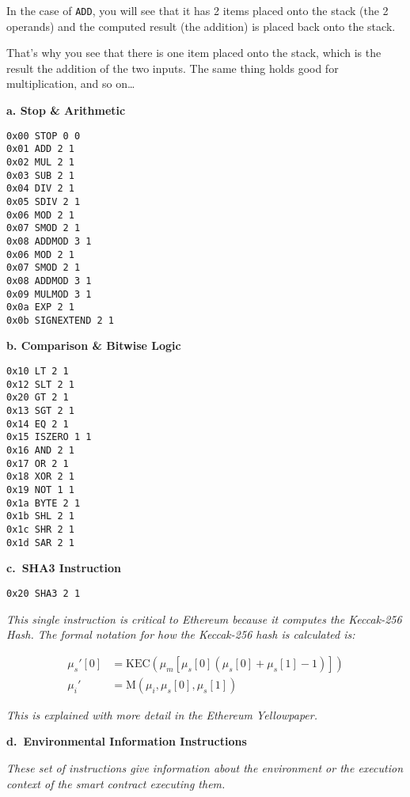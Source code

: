 In the case of \texttt{ADD}, you will see that it has 2 items placed
onto the stack (the 2 operands) and the computed result (the addition)
is placed back onto the stack.

That's why you see that there is one item placed onto the stack, which
is the result the addition of the two inputs. The same thing holds good
for multiplication, and so on\ldots{}

\hfill\break
\textbf{a. Stop \& Arithmetic}

\begin{lstlisting}[language=Solidity,numbers=none]
0x00 STOP 0 0
0x01 ADD 2 1
0x02 MUL 2 1
0x03 SUB 2 1
0x04 DIV 2 1
0x05 SDIV 2 1
0x06 MOD 2 1
0x07 SMOD 2 1
0x08 ADDMOD 3 1
0x06 MOD 2 1
0x07 SMOD 2 1
0x08 ADDMOD 3 1
0x09 MULMOD 3 1
0x0a EXP 2 1
0x0b SIGNEXTEND 2 1
\end{lstlisting}

\hfill\break
\textbf{b. Comparison \& Bitwise Logic}

\begin{lstlisting}[language=Solidity,numbers=none]
0x10 LT 2 1
0x12 SLT 2 1
0x20 GT 2 1
0x13 SGT 2 1
0x14 EQ 2 1
0x15 ISZERO 1 1
0x16 AND 2 1
0x17 OR 2 1
0x18 XOR 2 1
0x19 NOT 1 1
0x1a BYTE 2 1   
0x1b SHL 2 1
0x1c SHR 2 1
0x1d SAR 2 1
\end{lstlisting}

\hfill\break
\textbf{c.~SHA3 Instruction}

\begin{lstlisting}[language=Solidity,numbers=none]
0x20 SHA3 2 1
\end{lstlisting}

\emph{This single instruction is critical to Ethereum because it
computes the Keccak-256 Hash. The formal notation for how the Keccak-256
hash is calculated is:}

\begin{align*}
\mu_s'[0]&=\text{KEC}\left(\mu_m\left[\mu_s[0]\left(\mu_s[0]+\mu_s[1]-1\right)\right]\right)\\
\mu_i'&=\text{M}\left(\mu_i,\mu_s[0],\mu_s[1]\right)
\end{align*}

\emph{This is explained with more detail in the Ethereum Yellowpaper.}

\hfill\break
\textbf{d.~Environmental Information Instructions}

\emph{These set of instructions give information about the environment
or the execution context of the smart contract executing them.}

